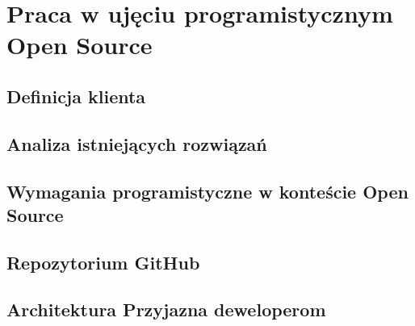 \chapter{Praca w ujęciu programistycznym Open Source}

\section{Definicja klienta}


\section{Analiza istniejących rozwiązań}
\section{Wymagania programistyczne w konteście Open Source}
\section{Repozytorium GitHub}
\section{Architektura Przyjazna deweloperom}

